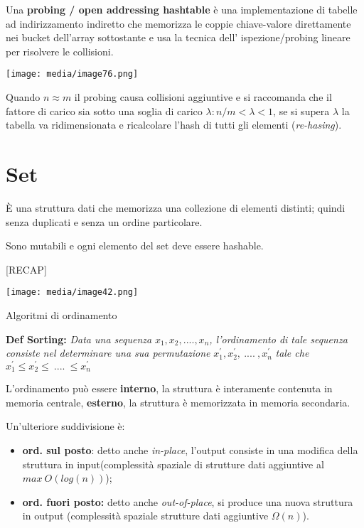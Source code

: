 Una \textbf{probing / open addressing hashtable} è una implementazione
di tabelle ad indirizzamento indiretto che memorizza le coppie
chiave-valore direttamente nei bucket dell'array sottostante e usa la
tecnica dell' ispezione/probing lineare per risolvere le collisioni.

\texttt{[image: media/image76.png]}

Quando \(n \approx m\) il probing causa collisioni aggiuntive e si
raccomanda che il fattore di carico sia sotto una soglia di carico
\(\lambda:n/m < \lambda < 1\), se si supera \(\lambda\) la tabella va
ridimensionata e ricalcolare l'hash di tutti gli elementi
(\emph{re-hasing}).

\section{Set}\label{set}

È una struttura dati che memorizza una collezione di elementi distinti;
quindi senza duplicati e senza un ordine particolare.

Sono mutabili e ogni elemento del set deve essere hashable.

{[}RECAP{]}

\texttt{[image: media/image42.png]}

Algoritmi di ordinamento

\textbf{Def \textbar{} Sorting:} \emph{Data una sequenza}
\(x_{1},x_{2},....,x_{n}\)\emph{, l'ordinamento di tale sequenza
consiste nel determinare una sua permutazione}
\(x_{1}^{'},x_{2}^{'},\ ....\ ,x_{n}^{'}\) \emph{tale che}
\(x_{1}^{'} \leq x_{2}^{'} \leq \ ....\  \leq x_{n}^{'}\)

L'ordinamento può essere \textbf{interno}, la struttura è interamente
contenuta in memoria centrale, \textbf{esterno}, la struttura è
memorizzata in memoria secondaria.

Un'ulteriore suddivisione è:

\begin{itemize}
\item
  \textbf{ord. sul posto}: detto anche \emph{in-place}, l'output
  consiste in una modifica della struttura in input(complessità spaziale
  di strutture dati aggiuntive al \(max\ O(log(n))\));
\item
  \textbf{ord. fuori posto:} detto anche \emph{out-of-place}, si produce
  una nuova struttura in output (complessità spaziale strutture dati
  aggiuntive \(\Omega(n)\)).
\end{itemize}

